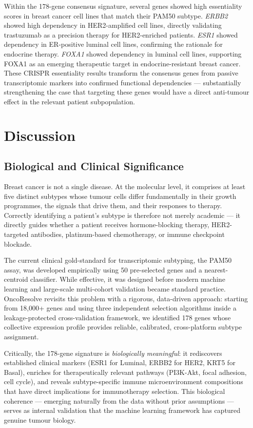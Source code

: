 \documentclass[10pt,a4paper,twocolumn]{article}
\begin{document}
Within the 178-gene consensus signature, several genes showed high essentiality scores in breast cancer cell lines that match their PAM50 subtype. \textit{ERBB2} showed high dependency in HER2-amplified cell lines, directly validating trastuzumab as a precision therapy for HER2-enriched patients. \textit{ESR1} showed dependency in ER-positive luminal cell lines, confirming the rationale for endocrine therapy. \textit{FOXA1} showed dependency in luminal cell lines, supporting FOXA1 as an emerging therapeutic target in endocrine-resistant breast cancer. These CRISPR essentiality results transform the consensus genes from passive transcriptomic markers into confirmed functional dependencies --- substantially strengthening the case that targeting these genes would have a direct anti-tumour effect in the relevant patient subpopulation.

\section{Discussion}

\subsection{Biological and Clinical Significance}

Breast cancer is not a single disease. At the molecular level, it comprises at least five distinct subtypes whose tumour cells differ fundamentally in their growth programmes, the signals that drive them, and their responses to therapy. Correctly identifying a patient's subtype is therefore not merely academic --- it directly guides whether a patient receives hormone-blocking therapy, HER2-targeted antibodies, platinum-based chemotherapy, or immune checkpoint blockade.

The current clinical gold-standard for transcriptomic subtyping, the PAM50 assay, was developed empirically using 50 pre-selected genes and a nearest-centroid classifier. While effective, it was designed before modern machine learning and large-scale multi-cohort validation became standard practice. OncoResolve revisits this problem with a rigorous, data-driven approach: starting from 18,000+ genes and using three independent selection algorithms inside a leakage-protected cross-validation framework, we identified 178 genes whose collective expression profile provides reliable, calibrated, cross-platform subtype assignment.

Critically, the 178-gene signature is \textit{biologically meaningful}: it rediscovers established clinical markers (ESR1 for Luminal, ERBB2 for HER2, KRT5 for Basal), enriches for therapeutically relevant pathways (PI3K-Akt, focal adhesion, cell cycle), and reveals subtype-specific immune microenvironment compositions that have direct implications for immunotherapy selection. This biological coherence --- emerging naturally from the data without prior assumptions --- serves as internal validation that the machine learning framework has captured genuine tumour biology.
\end{document}
